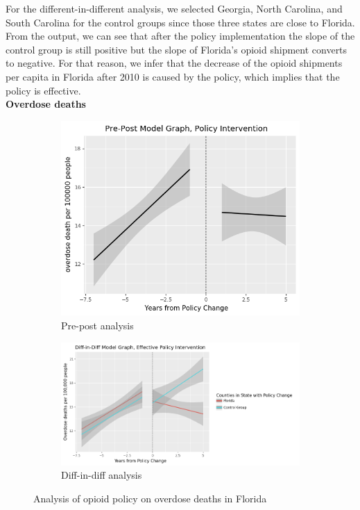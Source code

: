 \documentclass[12pt,letterpaper]{article}
\begin{document}
For the different-in-different analysis, we selected Georgia, North Carolina, and South Carolina for the control groups since those three states are close to Florida. From the output, we can see that after the policy implementation the slope of the control group is still positive but the slope of Florida's opioid shipment converts to negative. For that reason, we infer that the decrease of the opioid shipments per capita in Florida after 2010 is caused by the policy, which implies that the policy is effective. \\

\noindent \textbf{Overdose deaths} \\

\begin{figure}[!h]
\centering
\begin{subfigure}{.5\textwidth}
  \centering
  \includegraphics[width=0.7\linewidth]{../30_results/General_Results/florida_overdose_death_prepost.png}
  \caption{Pre-post analysis}
  \label{fig:fl_death_prepost}
\end{subfigure}%
\begin{subfigure}{.55\textwidth}
  \centering
  \includegraphics[width=1\linewidth]{../30_results/General_Results/florida_overdose_death_diffdiff.png}
  \caption{Diff-in-diff analysis}
  \label{fig:fl_death_did}
\end{subfigure}
\caption{Analysis of opioid policy on overdose deaths in Florida}
\label{fig:fl_death}
\end{figure}
\end{document}
